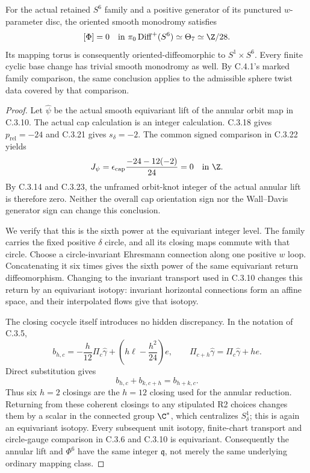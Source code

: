 \begin{theorem}
For the actual retained $S^6$ family and a positive generator
of its punctured $w$-parameter disc, the oriented smooth
monodromy satisfies
\[
 [\Phi]=0\quad\hbox{in }\pi_0\operatorname{Diff}^+(S^6)
                       \simeq\Theta_7\simeq\Z/28.
\]
Its mapping torus is consequently oriented-diffeomorphic to
$S^1\times S^6$. Every finite cyclic base change has trivial
smooth monodromy as well. By C.4.1's marked family comparison,
the same conclusion applies to the admissible sphere twist
data covered by that comparison.
\end{theorem}
\begin{proof}
Let $\widehat\psi$ be the actual smooth equivariant lift of
the annular orbit map in C.3.10.
The actual cap calculation is an integer calculation.
C.3.18 gives $p_{\mathrm{rel}}=-24$ and C.3.21 gives
$s_\delta=-2$. The common signed comparison in C.3.22 yields
\[
 J_\psi=\epsilon_{\rm cap}
          \frac{-24-12(-2)}{24}=0\quad\hbox{in }\Z.
\]
By C.3.14 and C.3.23, the unframed orbit-knot integer of the
actual annular lift is therefore zero. Neither the overall cap
orientation sign nor the Wall--Davis generator sign can change
this conclusion.

We verify that this is the sixth power at the equivariant
integer level. The family carries the fixed positive
$\delta$ circle, and all its closing maps commute with that
circle. Choose a circle-invariant Ehresmann connection along
one positive $w$ loop. Concatenating it six times gives the
sixth power of the same equivariant return diffeomorphism.
Changing to the invariant transport used in C.3.10 changes
this return by an equivariant isotopy: invariant horizontal
connections form an affine space, and their interpolated
flows give that isotopy.

The closing cocycle itself introduces no hidden discrepancy.
In the notation of C.3.5,
\[
 b_{h,c}=-\frac{h}{12}\Pi_c\widehat\gamma
             +\left(h\ell-\frac{h^2}{24}\right)e,
 \qquad \Pi_{c+h}\widehat\gamma
                   =\Pi_c\widehat\gamma+h e.
\]
Direct substitution gives
\[
 b_{h,c}+b_{k,c+h}=b_{h+k,c}.
\]
Thus six $h=2$ closings are the $h=12$ closing used for the
annular reduction. Returning from these coherent closings to
any stipulated R2 choices changes them by a scalar in the
connected group $\C^*$, which centralizes $S^1_\delta$;
this is again an equivariant isotopy. Every subsequent unit isotopy, finite-chart
transport and circle-gauge comparison in C.3.6 and C.3.10 is
equivariant. Consequently the annular lift and $\Phi^6$ have
the same integer $\mathfrak q$, not merely the same underlying
ordinary mapping class.


\end{proof}
